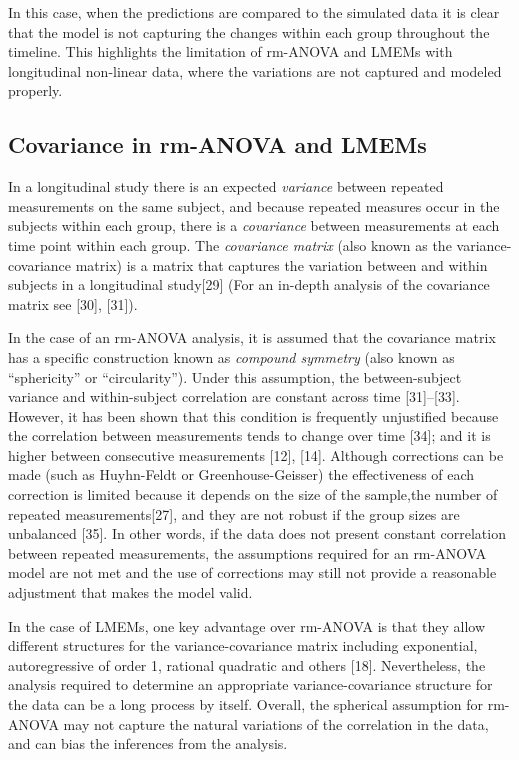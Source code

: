 \documentclass[
]{article}
\begin{document}
In this case, when the predictions are compared to the simulated data it is clear that the model is not capturing the changes within each group throughout the timeline. This highlights the limitation of rm-ANOVA and LMEMs with longitudinal non-linear data, where the variations are not captured and modeled properly.

\hypertarget{covariance-in-rm-anova-and-lmems}{%
\subsection{Covariance in rm-ANOVA and LMEMs}\label{covariance-in-rm-anova-and-lmems}}

In a longitudinal study there is an expected \emph{variance} between repeated measurements on the same subject, and because repeated measures occur in the subjects within each group, there is a \emph{covariance} between measurements at each time point within each group. The \emph{covariance matrix} (also known as the variance-covariance matrix) is a matrix that captures the variation between and within subjects in a longitudinal study{[}29{]} (For an in-depth analysis of the covariance matrix see {[}30{]}, {[}31{]}).

In the case of an rm-ANOVA analysis, it is assumed that the covariance matrix has a specific construction known as \emph{compound symmetry} (also known as ``sphericity'' or ``circularity''). Under this assumption, the between-subject variance and within-subject correlation are constant across time {[}31{]}--{[}33{]}. However, it has been shown that this condition is frequently unjustified because the correlation between measurements tends to change over time {[}34{]}; and it is higher between consecutive measurements {[}12{]}, {[}14{]}. Although corrections can be made (such as Huyhn-Feldt or Greenhouse-Geisser) the effectiveness of each correction is limited because it depends on the size of the sample,the number of repeated measurements{[}27{]}, and they are not robust if the group sizes are unbalanced {[}35{]}. In other words, if the data does not present constant correlation between repeated measurements, the assumptions required for an rm-ANOVA model are not met and the use of corrections may still not provide a reasonable adjustment that makes the model valid.

In the case of LMEMs, one key advantage over rm-ANOVA is that they allow different structures for the variance-covariance matrix including exponential, autoregressive of order 1, rational quadratic and others {[}18{]}. Nevertheless, the analysis required to determine an appropriate variance-covariance structure for the data can be a long process by itself. Overall, the spherical assumption for rm-ANOVA may not capture the natural variations of the correlation in the data, and can bias the inferences from the analysis.
\end{document}
